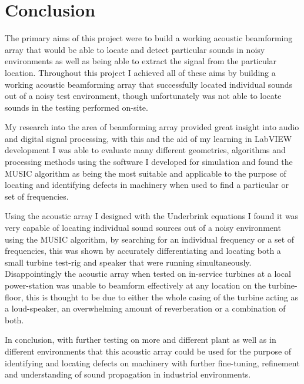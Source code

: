 \documentclass{UoNMCHA}
\numberwithin{equation}{section}
\begin{document}
\newpage
\section{Conclusion} \label{sec:Conclusion}
    
    The primary aims of this project were to build a working acoustic beamforming array that would be able to locate and detect particular sounds in noisy environments as well as being able to extract the signal from the particular location. Throughout this project I achieved all of these aims by building a working acoustic beamforming  array that successfully located individual sounds out of a noisy test environment, though unfortunately was not able to locate sounds in the testing performed on-site. 
    
    My research into the area of beamforming array provided great insight into audio and digital signal processing, with this and the aid of my learning in LabVIEW development I was able to evaluate many different geometries,  algorithms and processing methods using the software I developed for simulation and found the MUSIC algorithm as being the most suitable and applicable to the purpose of locating and identifying defects in machinery when used to find a particular or set of frequencies.
    
    Using the acoustic array I designed with the Underbrink equations I found it was very capable of locating individual sound sources out of a noisy environment using the MUSIC algorithm, by searching for an individual frequency or a set of frequencies, this was shown by accurately differentiating and locating both a small turbine test-rig and speaker that were running simultaneously. Disappointingly the acoustic array when tested on in-service turbines at a local power-station was unable to beamform effectively at any location on the turbine-floor, this is thought to be due to either the whole casing of the turbine acting as a loud-speaker, an overwhelming amount of reverberation or a combination of both.
    
    In conclusion, with further testing on more and different plant as well as in different environments that this acoustic array could be used for the purpose of identifying and locating defects on machinery with further fine-tuning, refinement and understanding of sound propagation in industrial environments.
\newpage

\end{document}
